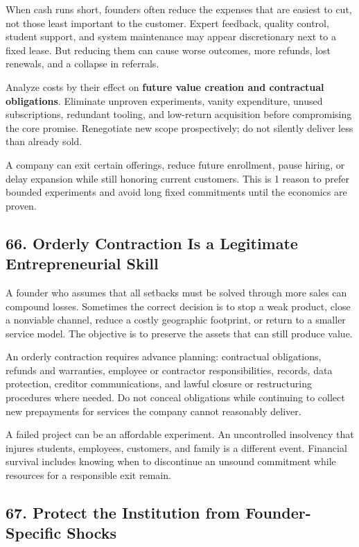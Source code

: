 When cash runs short, founders often reduce the expenses that are easiest to cut, not those least important to the customer. Expert feedback, quality control, student support, and system maintenance may appear discretionary next to a fixed lease. But reducing them can cause worse outcomes, more refunds, lost renewals, and a collapse in referrals.

Analyze costs by their effect on \textbf{future value creation and contractual obligations}. Eliminate unproven experiments, vanity expenditure, unused subscriptions, redundant tooling, and low-return acquisition before compromising the core promise. Renegotiate new scope prospectively; do not silently deliver less than already sold.

A company can exit certain offerings, reduce future enrollment, pause hiring, or delay expansion while still honoring current customers. This is 1 reason to prefer bounded experiments and avoid long fixed commitments until the economics are proven.

\subsection*{66. Orderly Contraction Is a Legitimate Entrepreneurial Skill}

A founder who assumes that all setbacks must be solved through more sales can compound losses. Sometimes the correct decision is to stop a weak product, close a nonviable channel, reduce a costly geographic footprint, or return to a smaller service model. The objective is to preserve the assets that can still produce value.

An orderly contraction requires advance planning: contractual obligations, refunds and warranties, employee or contractor responsibilities, records, data protection, creditor communications, and lawful closure or restructuring procedures where needed. Do not conceal obligations while continuing to collect new prepayments for services the company cannot reasonably deliver.

A failed project can be an affordable experiment. An uncontrolled insolvency that injures students, employees, customers, and family is a different event. Financial survival includes knowing when to discontinue an unsound commitment while resources for a responsible exit remain.

\subsection*{67. Protect the Institution from Founder-Specific Shocks}

